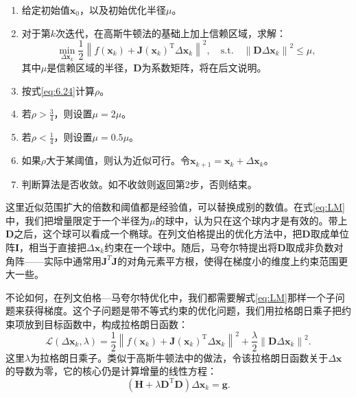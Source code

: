 \begin{mdframed}
\begin{enumerate}
	\item 给定初始值$\bm{x}_0$，以及初始优化半径$\mu$。
	\item 对于第$k$次迭代，在高斯牛顿法的基础上加上信赖区域，求解：
	\begin{equation}\label{eq:LM}
	\mathop {\min }\limits_{\Delta \bm{x}_k} \frac{1}{2}{\left\| {f\left( \bm{x}_k \right) + \bm{J} \left( \bm{x}_k \right)^\mathrm{T} \Delta \bm{x}_k} \right\|^2}, \quad \mathrm{s.t.}\quad {\left\| {\bm{D} \Delta \bm{x}_k} \right\|^2} \leqslant \mu ,
	\end{equation}
	其中$\mu$是信赖区域的半径，$\bm{D}$为系数矩阵，将在后文说明。
	\item 按式\eqref{eq:6.24}计算$\rho$。
	\item 若$\rho > \frac{3}{4}$，则设置$\mu = 2 \mu$。
	\item 若$\rho < \frac{1}{4}$，则设置$\mu = 0.5 \mu$。
	\item 如果$\rho$大于某阈值，则认为近似可行。令$\bm{x}_{k+1} = \bm{x}_k+\Delta \bm{x}_k$。
	\item 判断算法是否收敛。如不收敛则返回第2步，否则结束。
\end{enumerate}
 \end{mdframed}

这里近似范围扩大的倍数和阈值都是经验值，可以替换成别的数值。在式\eqref{eq:LM}中，我们把增量限定于一个半径为$\mu$的球中，认为只在这个球内才是有效的。带上$\bm{D}$之后，这个球可以看成一个椭球。在列文伯格提出的优化方法中，把$\bm{D}$取成单位阵$\bm{I}$，相当于直接把$\Delta \bm{x}_k$约束在一个球中。随后，马夸尔特提出将$\bm{D}$取成非负数对角阵——实际中通常用$\bm{J}^T \bm{J}$的对角元素平方根，使得在梯度小的维度上约束范围更大一些。

不论如何，在列文伯格—马夸尔特优化中，我们都需要解式\eqref{eq:LM}那样一个子问题来获得梯度。这个子问题是带不等式约束的优化问题，我们用拉格朗日乘子把约束项放到目标函数中，构成拉格朗日函数：
\begin{equation}
\mathcal{L}(\Delta \bm{x}_k, \lambda)= \frac{1}{2} {\left\| {f\left( \bm{x}_k \right) + \bm{J} \left( \bm{x}_k \right)^\mathrm{T} \Delta \bm{x}_k} \right\|^2} + \frac{\lambda}{2} \left\| \bm{D} \Delta \bm{x}_k \right\|^2 .
\end{equation}
这里$\lambda$为拉格朗日乘子。类似于高斯牛顿法中的做法，令该拉格朗日函数关于$\Delta \bm{x}$的导数为零，它的核心仍是计算增量的线性方程：
\begin{equation}
\left( \bm{H} +\lambda \bm{D}^\mathrm{T} \bm{D} \right) \Delta \bm{x}_k = \bm{g}.
\end{equation}

